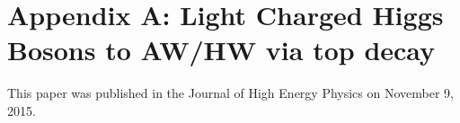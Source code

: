 \chapter{Appendix A: Light Charged Higgs Bosons to AW/HW via top decay}
This paper was published in the Journal of High Energy Physics on November 9, 2015.

